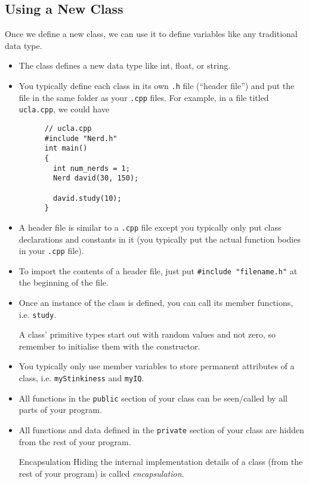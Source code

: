 \documentclass[class=article, crop=false]{standalone}
\begin{document}
  \subsection{Using a New Class}
  Once we define a new class, we can use it to define variables like any traditional data type.
  \begin{itemize}
    \item The class defines a new data type like int, float, or string.
    \item You typically define each class in its own \texttt{.h} file (``header file'') and put the file in the same folder as your \texttt{.cpp} files. For example, in a file titled \texttt{ucla.cpp}, we could have
    \begin{lstlisting}
      // ucla.cpp
      #include "Nerd.h"
      int main()
      {
        int num_nerds = 1;
        Nerd david(30, 150);

        david.study(10);
      }
    \end{lstlisting}
    \item A header file is similar to a \texttt{.cpp} file except you typically only put class declarations and constants in it (you typically put the actual function bodies in your \texttt{.cpp} file).
    \item To import the contents of a header file, just put \texttt{\#include "filename.h"} at the beginning of the file.
    \item Once an instance of the class is defined, you can call its member functions, i.e. \texttt{study}.
    \begin{note}{}
      A class' primitive types start out with random values and not zero, so remember to initialise them with the constructor.
    \end{note}
    \item You typically only use member variables to store permanent attributes of a class, i.e. \texttt{myStinkiness} and \texttt{myIQ}.
    \item All functions in the \texttt{public} section of your class can be seen/called by all parts of your program.
    \item All functions and data defined in the \texttt{private} section of your class are hidden from the rest of your program.
    \begin{definition}{Encapsulation}
      Hiding the internal implementation details of a class (from the rest of your program) is called \emph{encapsulation}.
    \end{definition}
  \end{itemize}
\end{document}
